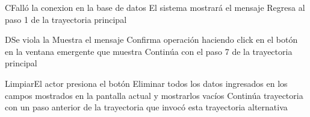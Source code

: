 
\begin{UCtrayectoriaA}{C}{Falló la conexion en la base de datos}
			\UCpaso[\UCsist] El sistema mostrará el mensaje 
			\UCpaso[\UCsist] Regresa al paso 1 de la trayectoria principal  
\end{UCtrayectoriaA}


\begin{UCtrayectoriaA}{D}{Se viola la }
			\UCpaso[\UCsist] Muestra el mensaje  
			\UCpaso[\UCactor] Confirma operación haciendo click en el botón  en la ventana emergente que muestra
			\UCpaso[\UCsist] Continúa con el paso 7 de la trayectoria principal  
\end{UCtrayectoriaA}


\begin{UCtrayectoriaA}{Limpiar}{El actor presiona el botón }
			\UCpaso[\UCsist] Eliminar todos los datos ingresados en los campos mostrados en la pantalla actual y mostrarlos vacíos
			\UCpaso[\UCsist] Continúa trayectoria con un paso anterior de la trayectoria que invocó esta trayectoria alternativa
\end{UCtrayectoriaA}